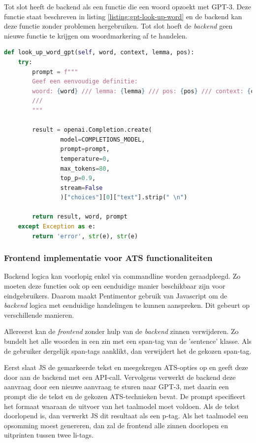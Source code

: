 
Tot slot heeft de backend als een functie die een woord opzoekt met GPT-3. Deze functie staat beschreven in listing \ref{listing:gpt-look-up-word} en de backend kan deze functie zonder problemen hergebruiken. Tot slot hoeft de \textit{backend} geen nieuwe functie te krijgen om woordmarkering af te handelen.

\begin{lstlisting}[language=python, caption={Een API-call sturen naar GPT-3 om de definitie van een woord op te halen.}, label={listing:gpt-look-up-word}]
def look_up_word_gpt(self, word, context, lemma, pos):
	try:
		prompt = f"""
		Geef een eenvoudige definitie:
		woord: {word} /// lemma: {lemma} /// pos: {pos} /// context: {context}
		///
		"""
	
		result = openai.Completion.create(
				model=COMPLETIONS_MODEL,
				prompt=prompt,
				temperature=0,
				max_tokens=80,
				top_p=0.9,
				stream=False
				)["choices"][0]["text"].strip(" \n")   
		
		return result, word, prompt
	except Exception as e:
		return 'error', str(e), str(e)
\end{lstlisting}

\subsubsection{Frontend implementatie voor ATS functionaliteiten}

Backend logica kan voorlopig enkel via commandline worden geraadpleegd. Zo moeten deze functies ook op een eenduidige manier beschikbaar zijn voor eindgebruikers. Daarom maakt Pentimentor gebruik van Javascript om de \textit{backend} logica met eenduidige handelingen te kunnen aanspreken. Dit gebeurt op verschillende manieren.


Allereerst kan de \textit{frontend} zonder hulp van de \textit{backend} zinnen verwijderen. Zo bundelt het alle woorden in een zin met een span-tag van de 'sentence' klasse. Als de gebruiker dergelijk span-tags aanklikt, dan verwijdert het de gekozen span-tag.

\medspace

Eerst slaat JS de gemarkeerde tekst en meegekregen ATS-opties op en geeft deze door aan de backend met een API-call. Vervolgens verwerkt de backend deze aanvraag door een nieuwe aanvraag te sturen naar GPT-3, met daarin een prompt die de tekst en de gekozen ATS-technieken bevat. De prompt specifieert het formaat waaraan de uitvoer van het taalmodel moet voldoen.  Als de tekst doorlopend is, dan verwerkt JS dit resultaat als een p-tag.  Als het taalmodel een opsomming moest genereren, dan zal de frontend alle zinnen doorlopen en uitprinten tussen twee li-tags.

